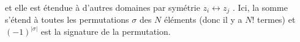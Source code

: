 et elle est étendue à d'autres domaines par symétrie $z_i \leftrightarrow z_j$ . Ici, la somme s'étend à toutes les permutations $\sigma$ des $N$ éléments (donc il y a $N!$ termes) et $(-1)^{|\sigma|}$ est la signature de la permutation. %









